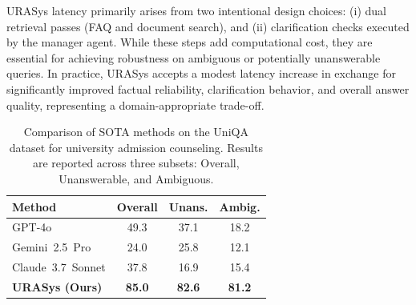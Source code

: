 \documentclass[11pt]{article}
\begin{document}
URASys latency primarily arises from two intentional design choices: (i) dual retrieval passes (FAQ and document search), and (ii) clarification checks executed by the manager agent. While these steps add computational cost, they are essential for achieving robustness on ambiguous or potentially unanswerable queries. In practice, URASys accepts a modest latency increase in exchange for significantly improved factual reliability, clarification behavior, and overall answer quality, representing a domain-appropriate trade-off.



\begin{table}[!t]
\centering
\caption{
Comparison of SOTA methods on the UniQA dataset for university admission counseling. Results are reported across three subsets: Overall, Unanswerable, and Ambiguous.
}
\label{tab:result_1}
\begin{tabular}{l|c|c|c}
\toprule
\textbf{Method} & \textbf{Overall} & \textbf{Unans.} & \textbf{Ambig.} \\
\midrule
GPT-4o             & 49.3 & 37.1 & 18.2 \\
Gemini~2.5~Pro     & 24.0 & 25.8 & 12.1 \\
Claude~3.7~Sonnet  & 37.8 & 16.9 & 15.4 \\
\midrule
\textbf{URASys (Ours)} & \textbf{85.0} & \textbf{82.6} & \textbf{81.2} \\
\bottomrule
\end{tabular}
\end{table}
\begin{table}[!ht]
\centering
\caption{Descriptions of the six question topics.}
\label{tab:topic_description}
\end{table}
\end{document}
